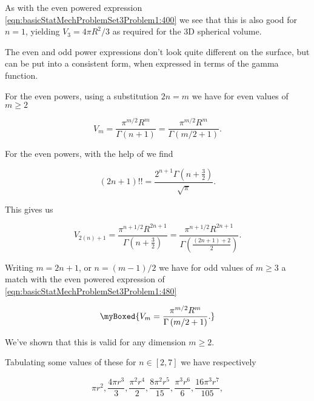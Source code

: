 {As with the even powered expression \ref{eqn:basicStatMechProblemSet3Problem1:400} we see that this is also good for $n = 1$, yielding $V_3 = 4 \pi R^2/3$ as required for the 3D spherical volume.

The even and odd power expressions don't look quite different on the surface, but can be put into a consistent form, when expressed in terms of the gamma function.  

For the even powers, using a substitution $2 n = m$ we have for even values of $m \ge 2$

\begin{equation}\label{eqn:basicStatMechProblemSet3Problem1:480}
V_{m} 
= \frac{\pi^{m/2} R^m}{\Gamma(n + 1)}
= \frac{\pi^{m/2} R^m}{\Gamma(m/2 + 1)}.
\end{equation}

For the even powers, with the help of \citep{abramowitz1964handbook} we find

\begin{equation}\label{eqn:basicStatMechProblemSet3Problem1:500}
(2 n + 1)!! = \frac{2^{n+1} \Gamma\left(n + \frac{3}{2}\right)}{\sqrt{\pi}}.
\end{equation}

This gives us

\begin{dmath}\label{eqn:basicStatMechProblemSet3Problem1:520}
V_{2(n)+1} 
= \frac{\pi^{n + 1/2} R^{2 n + 1}}{\Gamma\left(n + \frac{3}{2}\right)}
= \frac{\pi^{n + 1/2} R^{2 n + 1}}{\Gamma\left(\frac{(2 n + 1) + 2}{2}\right)}.
\end{dmath}

Writing $m = 2 n + 1$, or $n = (m - 1)/2$ we have for odd values of $m \ge 3$ a match with the even powered expression of \ref{eqn:basicStatMechProblemSet3Problem1:480}

\begin{equation}\label{eqn:basicStatMechProblemSet3Problem1:540}
\myBoxed{
V_{m} 
= 
\frac{ \pi^{m/2} R^{m} }
{
   \Gamma\left( m/2 + 1 \right)
}.
}
\end{equation}

We've shown that this is valid for any dimension $m \ge 2$.

Tabulating some values of these for $n \in [2, 7]$ we have respectively

\begin{equation}\label{eqn:basicStatMechProblemSet3Problem1:580}
\pi  r^2,\frac{4 \pi  r^3}{3},\frac{\pi ^2 r^4}{2},\frac{8 \pi ^2 r^5}{15},\frac{\pi ^3 r^6}{6},\frac{16 \pi ^3 r^7}{105},
\end{equation}

}
